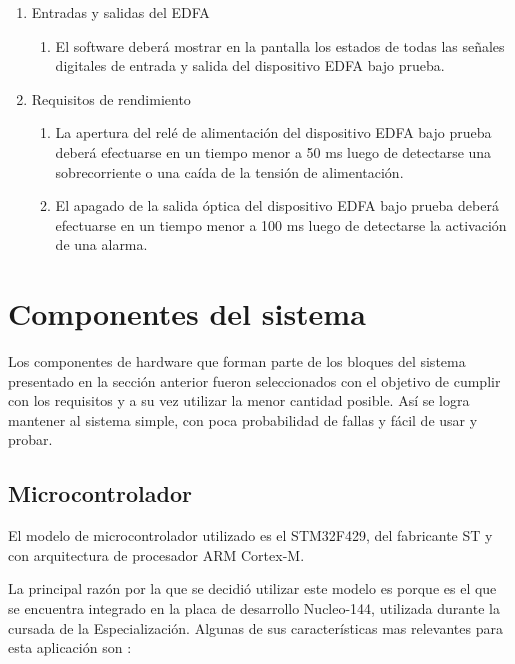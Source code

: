 \begin{enumerate}
\item Entradas y salidas del EDFA
	\begin{enumerate}
	\item El software deberá mostrar en la pantalla los estados de todas las señales digitales de entrada y salida del dispositivo EDFA bajo prueba.
	\end{enumerate}

\item Requisitos de rendimiento
	\begin{enumerate}
	\item La apertura del relé de alimentación del dispositivo EDFA 		bajo prueba deberá efectuarse en un tiempo menor a 50 ms luego de 		detectarse una sobrecorriente o una caída de la tensión de 				alimentación.
	\item El apagado de la salida óptica del dispositivo EDFA bajo 			prueba deberá efectuarse en un tiempo menor a 100 ms luego de 			detectarse la activación de una alarma.
	\end{enumerate}
	
\end{enumerate}

\section{Componentes del sistema}

Los componentes de hardware que forman parte de los bloques del sistema presentado en la sección anterior fueron seleccionados con el objetivo de cumplir con los requisitos y a su vez utilizar la menor cantidad posible. Así se logra mantener al sistema simple, con poca probabilidad de fallas y fácil de usar y probar.

\subsection{Microcontrolador}

El modelo de microcontrolador utilizado es el STM32F429, del fabricante ST y con arquitectura de procesador ARM Cortex-M.

La principal razón por la que se decidió utilizar este modelo es porque es el que se encuentra integrado en la placa de desarrollo Nucleo-144, utilizada durante la cursada de la Especialización. Algunas de sus características mas relevantes para esta aplicación son \citep{STM32F429}:

